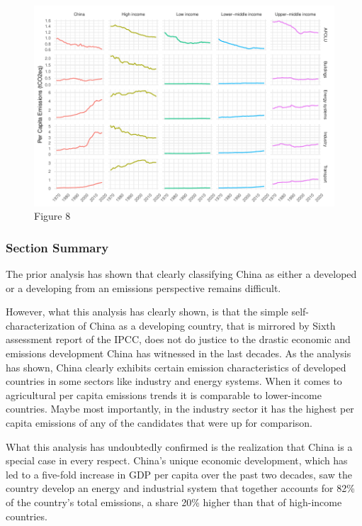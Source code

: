 \documentclass[
  12pt,
]{article}
\numberwithin{equation}{section}
\numberwithin{table}{section}
\numberwithin{figure}{section}
\begin{document}
\begin{figure}
\centering
\includegraphics{Paper_files/figure-latex/unnamed-chunk-8-1.pdf}
\caption{Figure 8}
\end{figure}

\hypertarget{section-summary}{%
\subsubsection{Section Summary}\label{section-summary}}

The prior analysis has shown that clearly classifying China as either a
developed or a developing from an emissions perspective remains
difficult.

However, what this analysis has clearly shown, is that the simple
self-characterization of China as a developing country, that is mirrored
by Sixth assessment report of the IPCC, does not do justice to the
drastic economic and emissions development China has witnessed in the
last decades. As the analysis has shown, China clearly exhibits certain
emission characteristics of developed countries in some sectors like
industry and energy systems. When it comes to agricultural per capita
emissions trends it is comparable to lower-income countries. Maybe most
importantly, in the industry sector it has the highest per capita
emissions of any of the candidates that were up for comparison.

What this analysis has undoubtedly confirmed is the realization that
China is a special case in every respect. China's unique economic
development, which has led to a five-fold increase in GDP per capita
over the past two decades, saw the country develop an energy and
industrial system that together accounts for 82\% of the country's total
emissions, a share 20\% higher than that of high-income countries.
\end{document}
